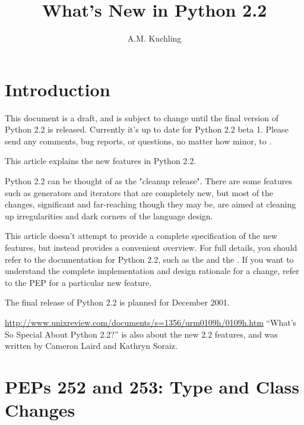 \documentclass{howto}
\title{What's New in Python 2.2}
\author{A.M. Kuchling}
\begin{document}
\maketitle\tableofcontents

\section{Introduction}

{\large This document is a draft, and is subject to change until the
final version of Python 2.2 is released.  Currently it's up to date
for Python 2.2 beta 1.  Please send any comments, bug reports, or
questions, no matter how minor, to .
}

This article explains the new features in Python 2.2.

Python 2.2 can be thought of as the "cleanup release".  There are some
features such as generators and iterators that are completely new, but
most of the changes, significant and far-reaching though they may be,
are aimed at cleaning up irregularities and dark corners of the
language design.

This article doesn't attempt to provide a complete specification of
the new features, but instead provides a convenient overview.  For
full details, you should refer to the documentation for Python 2.2,
such as the
 and the
.   
If you want to understand the complete implementation and design
rationale for a change, refer to the PEP for a particular new feature.

The final release of Python 2.2 is planned for December 2001.

\begin{seealso}

\url{http://www.unixreview.com/documents/s=1356/urm0109h/0109h.htm}
{``What's So Special About Python 2.2?'' is also about the new 2.2
features, and was written by Cameron Laird and Kathryn Soraiz.}

\end{seealso}


\section{PEPs 252 and 253: Type and Class Changes}
\end{document}
